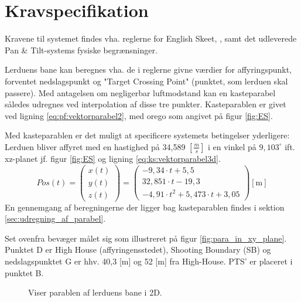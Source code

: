 \section{Kravspecifikation}
\label{sec:kravspecifikation}
Kravene til systemet findes vha. reglerne for English Skeet, \citep{ES_regler},
samt det udleverede Pan \& Tilt-systems fysiske begrænsninger.


Lerduens bane kan beregnes vha. de i reglerne givne værdier for affyringspunkt, forventet nedslagspunkt
og "Target Crossing Point" (punktet, som lerduen skal passere).
Med antagelsen om negligerbar luftmodstand kan en kasteparabel således udregnes ved interpolation af disse tre punkter.
Kasteparablen er givet ved ligning \ref{eq:pf:vektorparabel2}, med orego som angivet på figur \ref{fig:ES}.

Med kasteparablen er det muligt at specificere systemets betingelser yderligere:
Lerduen bliver affyret med en hastighed på 34,589 \([\frac{m}{s}]\) i en vinkel på \(9,103^{\circ}\) ift. xz-planet jf. figur \ref{fig:ES} og ligning \ref{eq:ks:vektorparabel3d}.
\begin{equation}
Pos\left( t \right) = 
\left( \begin{matrix} 
	x\left( t \right)  \\ 
	y\left( t \right)  \\ 
	z\left( t \right)  \end{matrix} \right) =
	 \left( \begin{matrix} 
	- 9,34\cdot t+5,5 \\
  32,851\cdot t-19,3 \\ 
 -{ 4,91\cdot t }^{ 2 }+5,473\cdot t+3,05\end{matrix} \right) [\text{m}]
\label{eq:ks:vektorparabel3d}
\end{equation}
En gennemgang af beregningerne der ligger bag kasteparablen findes i sektion \ref{sec:udregning_af_parabel}.

Set ovenfra bevæger målet sig som illustreret på figur \ref{fig:para_in_xy_plane}. Punktet D er High House (affyringensstedet), Shooting Boundary (SB) og nedslagspunktet G er hhv. 40,3 [m] og 52 [m] fra High-House. PTS' er placeret i punktet B.\\
\begin{figure}[h!]
\centering
{}
\caption[Lerduens parabel i 2D]{Viser parablen af lerduens bane i 2D.}
\end{figure}

